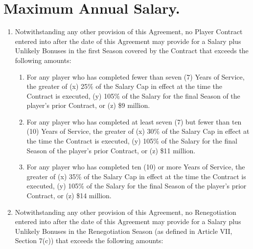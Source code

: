 \documentclass[
]{book}
\providecommand{\tightlist}{%
  \setlength{\itemsep}{0pt}\setlength{\parskip}{0pt}}
\begin{document}
\hypertarget{maximum-annual-salary.}{%
\section{Maximum Annual Salary.}\label{maximum-annual-salary.}}

\begin{enumerate}
\def\labelenumi{(\alph{enumi})}
\tightlist
\item
  Notwithstanding any other provision of this Agreement, no Player Contract entered into after the date of this Agreement may provide for a Salary plus Unlikely Bonuses in the first Season covered by the Contract that exceeds the following amounts:

  \begin{enumerate}
  \def\labelenumii{(\roman{enumii})}
  \tightlist
  \item
    For any player who has completed fewer than seven (7) Years of Service, the greater of (x) 25\% of the Salary Cap in effect at the time the Contract is executed, (y) 105\% of the Salary for the final Season of the player's prior Contract, or (z) \$9 million.
  \item
    For any player who has completed at least seven (7) but fewer than ten (10) Years of Service, the greater of (x) 30\% of the Salary Cap in effect at the time the Contract is executed, (y) 105\% of the Salary for the final Season of the player's prior Contract, or (z) \$11 million.
  \item
    For any player who has completed ten (10) or more Years of Service, the greater of (x) 35\% of the Salary Cap in effect at the time the Contract is executed, (y) 105\% of the Salary for the final Season of the player's prior Contract, or (z) \$14 million.
  \end{enumerate}
\item
  Notwithstanding any other provision of this Agreement, no Renegotiation entered into after the date of this Agreement may provide for a Salary plus Unlikely Bonuses in the Renegotiation Season (as defined in Article VII, Section 7(c)) that exceeds the following amounts:


\end{enumerate}
\end{document}
